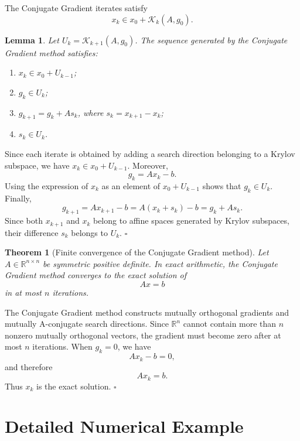 \documentclass[11pt,a4paper]{report}
\theoremstyle{definition}
\theoremstyle{plain}
\newtheorem{theorem}{Theorem}[chapter]
\newtheorem{lemma}{Lemma}[chapter]
\theoremstyle{remark}
\renewenvironment{proof}[1][Proof]{%
  \begin{tcolorbox}[enhanced, breakable, colback=white, colframe=black!25, boxrule=0.5pt, arc=1.5mm, borderline west={2pt}{0pt}{black!45}, title=\textbf{#1}, coltitle=bleufonce, fonttitle=\bfseries]
}{%
  \hfill$\square$\end{tcolorbox}
}
\begin{document}
The Conjugate Gradient iterates satisfy
\[
x_k\in x_0+\mathcal{K}_k(A,g_0).
\]

\begin{lemma}
Let $U_k=\mathcal{K}_{k+1}(A,g_0)$. The sequence generated by the Conjugate Gradient method satisfies:
\begin{enumerate}
    \item $x_k\in x_0+U_{k-1}$;
    \item $g_k\in U_k$;
    \item $g_{k+1}=g_k+As_k$, where $s_k=x_{k+1}-x_k$;
    \item $s_k\in U_k$.
\end{enumerate}
\end{lemma}

\begin{proof}
Since each iterate is obtained by adding a search direction belonging to a Krylov subspace, we have $x_k\in x_0+U_{k-1}$. Moreover,
\[
g_k=Ax_k-b.
\]
Using the expression of $x_k$ as an element of $x_0+U_{k-1}$ shows that $g_k\in U_k$. Finally,
\[
g_{k+1}
=
Ax_{k+1}-b
=
A(x_k+s_k)-b
=
g_k+As_k.
\]
Since both $x_{k+1}$ and $x_k$ belong to affine spaces generated by Krylov subspaces, their difference $s_k$ belongs to $U_k$.
\end{proof}

\begin{theorem}[Finite convergence of the Conjugate Gradient method]
Let $A\in\mathbb{R}^{n\times n}$ be symmetric positive definite. In exact arithmetic, the Conjugate Gradient method converges to the exact solution of
\[
Ax=b
\]
in at most $n$ iterations.
\end{theorem}

\begin{proof}
The Conjugate Gradient method constructs mutually orthogonal gradients and mutually A-conjugate search directions. Since $\mathbb{R}^n$ cannot contain more than $n$ nonzero mutually orthogonal vectors, the gradient must become zero after at most $n$ iterations. When $g_k=0$, we have
\[
Ax_k-b=0,
\]
and therefore
\[
Ax_k=b.
\]
Thus $x_k$ is the exact solution.
\end{proof}

\chapter{Detailed Numerical Example}
\end{document}
